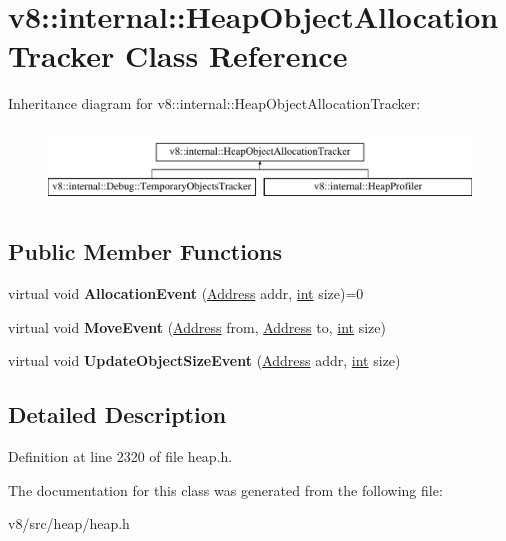 \hypertarget{classv8_1_1internal_1_1HeapObjectAllocationTracker}{}\section{v8\+:\+:internal\+:\+:Heap\+Object\+Allocation\+Tracker Class Reference}
\label{classv8_1_1internal_1_1HeapObjectAllocationTracker}
Inheritance diagram for v8\+:\+:internal\+:\+:Heap\+Object\+Allocation\+Tracker\+:\begin{figure}[H]
\begin{center}
\leavevmode
\includegraphics[height=2.000000cm]{classv8_1_1internal_1_1HeapObjectAllocationTracker}
\end{center}
\end{figure}
\subsection*{Public Member Functions}
\begin{DoxyCompactItemize}
\item 
\mbox{\label{classv8_1_1internal_1_1HeapObjectAllocationTracker_a85d818b036158e8658208d5c35ce1506}} 
virtual void {\bfseries Allocation\+Event} (\mbox{\hyperlink{classuintptr__t}{Address}} addr, \mbox{\hyperlink{classint}{int}} size)=0
\item 
\mbox{\label{classv8_1_1internal_1_1HeapObjectAllocationTracker_ad37a501d0e342842d8152906f6b49b7b}} 
virtual void {\bfseries Move\+Event} (\mbox{\hyperlink{classuintptr__t}{Address}} from, \mbox{\hyperlink{classuintptr__t}{Address}} to, \mbox{\hyperlink{classint}{int}} size)
\item 
\mbox{\label{classv8_1_1internal_1_1HeapObjectAllocationTracker_a7215aaf4ae19bc80707cdf47f421605a}} 
virtual void {\bfseries Update\+Object\+Size\+Event} (\mbox{\hyperlink{classuintptr__t}{Address}} addr, \mbox{\hyperlink{classint}{int}} size)
\end{DoxyCompactItemize}


\subsection{Detailed Description}


Definition at line 2320 of file heap.\+h.



The documentation for this class was generated from the following file\+:\begin{DoxyCompactItemize}
\item 
v8/src/heap/heap.\+h\end{DoxyCompactItemize}
